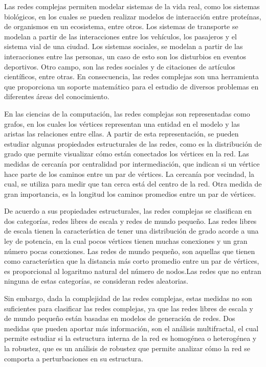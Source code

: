 Las redes complejas permiten modelar sistemas de la vida real, como los sistemas biológicos, en los cuales se pueden realizar modelos de interacción entre proteínas, de organismos en un ecosistema, entre otros. Los sistemas de transporte se modelan a partir de las interacciones entre los vehículos, los pasajeros y el sistema vial de una ciudad. Los sistemas sociales, se modelan a partir de las interacciones entre las personas, un caso de esto son los disturbios en eventos deportivos. Otro campo, son las redes sociales y de citaciones de artículos científicos, entre otras. En consecuencia, las redes complejas son una herramienta que proporciona un soporte matemático para el estudio de diversos problemas en diferentes áreas del conocimiento.

En las ciencias de la computación, las redes complejas son representadas como grafos, en los cuales los vértices representan una entidad en el modelo y las aristas las relaciones entre ellas. A partir de esta representación, se pueden estudiar algunas propiedades estructurales de las redes, como es la distribución de grado que permite visualizar cómo están conectados los vértices en la red. Las medidas de cercanía por centralidad por intermediación, que indican si un vértice hace parte de los caminos entre un par de vértices. La cercanía por vecindad, la cual, se utiliza para medir que tan cerca está del centro de la red. Otra medida de gran importancia, es la longitud los caminos promedios entre un par de vértices.

De acuerdo a sus propiedades estructurales, las redes complejas se clasifican en dos categorías, redes libres de escala y redes de mundo pequeño. Las redes libres de escala tienen la característica de tener una distribución de grado acorde a una ley de potencia, en la cual pocos vértices tienen muchas conexiones y un gran número pocas conexiones. Las redes de mundo pequeño, son aquellas que tienen como característica que la distancia más corto promedio entre un par de vértices, es proporcional al logaritmo natural del número de nodos.Las redes que no entran ninguna de estas categorías, se consideran redes aleatorias.

Sin embargo, dada la complejidad de las redes complejas, estas medidas no son suficientes para clasificar las redes complejas, ya que las redes libres de escala y de mundo pequeño están basadas en modelos de generación de redes. Dos medidas que pueden aportar más información, son el análisis multifractal, el cual permite estudiar si la estructura interna de la red es homogénea o heterogénea y la robustez, que es un análisis de robustez que permite analizar cómo la red se comporta a perturbaciones en su estructura.


